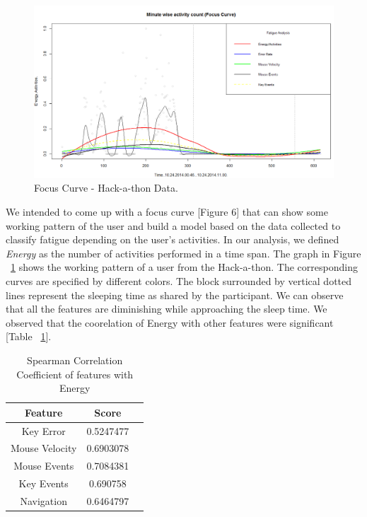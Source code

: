 \documentclass{acm_proc_article-sp}
\begin{document}
	\begin{figure}
		\centering
		\includegraphics[width=1\textwidth,natwidth=1261,natheight=726]{focusCurveHack.png}
		\caption{Focus Curve - Hack-a-thon Data.}
		\label{fig:hackUser}
  	\end{figure}
We intended to come up with a focus curve [Figure 6] that can show some working
pattern of the user and build a model based on the data collected to classify
fatigue depending on the user's activities. In our analysis, we defined
\textit{Energy} as the number of activities performed in a time span.
The graph in Figure ~\ref{fig:hackUser} shows the working pattern of a user from
the Hack-a-thon. The corresponding curves are specified by different colors. The
block surrounded by vertical dotted lines represent the sleeping time as shared
by the participant. We can observe that all the features are diminishing while
approaching the sleep time. We observed that the coorelation of Energy with
other features were significant [Table ~\ref{table:question}].
	\begin{table}
		\centering
		\caption{Spearman Correlation Coefficient of features with Energy}
		\begin{tabular}{|c|c|l|} \hline
			Feature&Score\\ \hline
			Key Error & 0.5247477\\ \hline
			Mouse Velocity & 0.6903078\\ \hline
			Mouse Events & 0.7084381\\ \hline
			Key Events & 0.690758\\ \hline
			Navigation & 0.6464797\\ \hline
		\end{tabular}
		\label{table:question}
	\end{table}
	
\end{document}
